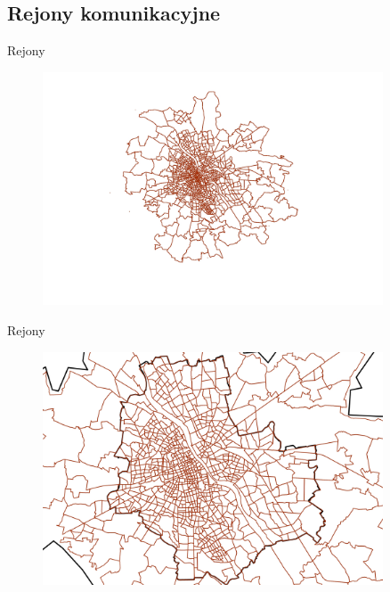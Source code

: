 \documentclass[8pt]{beamer}
\begin{document}
\subsection{Rejony komunikacyjne}
\begin{frame}{Rejony}
\begin{figure}\begin{center}
\includegraphics[width=0.9\textwidth]{zones1}
 \end{center}  \end{figure} 
\end{frame}

\begin{frame}{Rejony}
\begin{figure}\begin{center}
\includegraphics[width=0.9\textwidth]{zones2}
 \end{center}  \end{figure} 
\end{frame}
\end{document}
